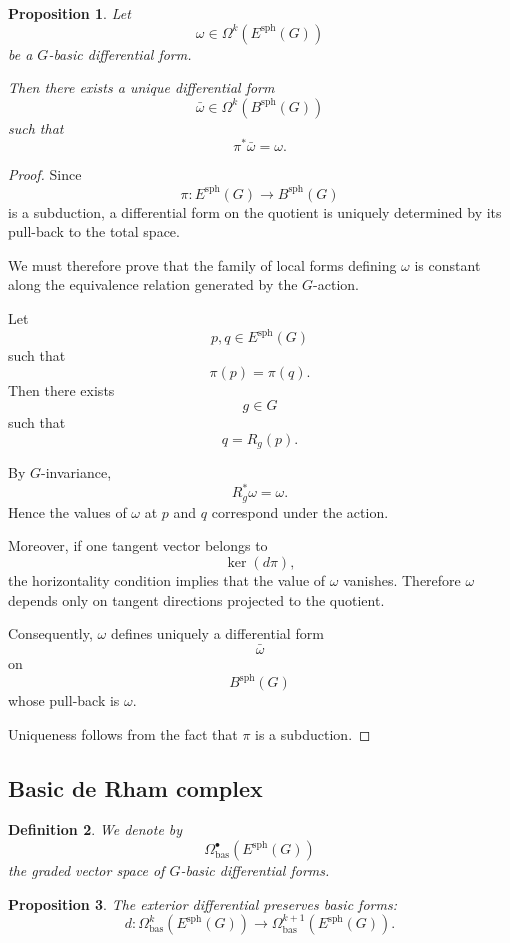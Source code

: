 \documentclass[11pt]{amsart}
\newtheorem{definition}{Definition}[section]
\newtheorem{proposition}[definition]{Proposition}
\begin{document}
\begin{proposition}
Let
\[
\omega\in \Omega^k(E^{\mathrm{sph}}(G))
\]
be a \(G\)-basic differential form.

Then there exists a unique differential form
\[
\bar\omega
\in
\Omega^k(B^{\mathrm{sph}}(G))
\]
such that
\[
\pi^*\bar\omega=\omega.
\]
\end{proposition}

\begin{proof}
Since
\[
\pi:
E^{\mathrm{sph}}(G)\to B^{\mathrm{sph}}(G)
\]
is a subduction, a differential form on the quotient is uniquely determined by
its pull-back to the total space.

We must therefore prove that the family of local forms defining \(\omega\) is
constant along the equivalence relation generated by the \(G\)-action.

Let
\[
p,q\in E^{\mathrm{sph}}(G)
\]
such that
\[
\pi(p)=\pi(q).
\]
Then there exists
\[
g\in G
\]
such that
\[
q=R_g(p).
\]

By \(G\)-invariance,
\[
R_g^*\omega=\omega.
\]
Hence the values of \(\omega\) at \(p\) and \(q\) correspond under the action.

Moreover, if one tangent vector belongs to
\[
\ker(d\pi),
\]
the horizontality condition implies that the value of \(\omega\) vanishes.
Therefore \(\omega\) depends only on tangent directions projected to the
quotient.

Consequently, \(\omega\) defines uniquely a differential form
\[
\bar\omega
\]
on
\[
B^{\mathrm{sph}}(G)
\]
whose pull-back is \(\omega\).

Uniqueness follows from the fact that \(\pi\) is a subduction.
\end{proof}

\subsection{Basic de Rham complex}

\begin{definition}
We denote by
\[
\Omega^\bullet_{\mathrm{bas}}(E^{\mathrm{sph}}(G))
\]
the graded vector space of \(G\)-basic differential forms.
\end{definition}

\begin{proposition}
The exterior differential preserves basic forms:
\[
d:
\Omega^k_{\mathrm{bas}}(E^{\mathrm{sph}}(G))
\longrightarrow
\Omega^{k+1}_{\mathrm{bas}}(E^{\mathrm{sph}}(G)).
\]
\end{proposition}
\end{document}
